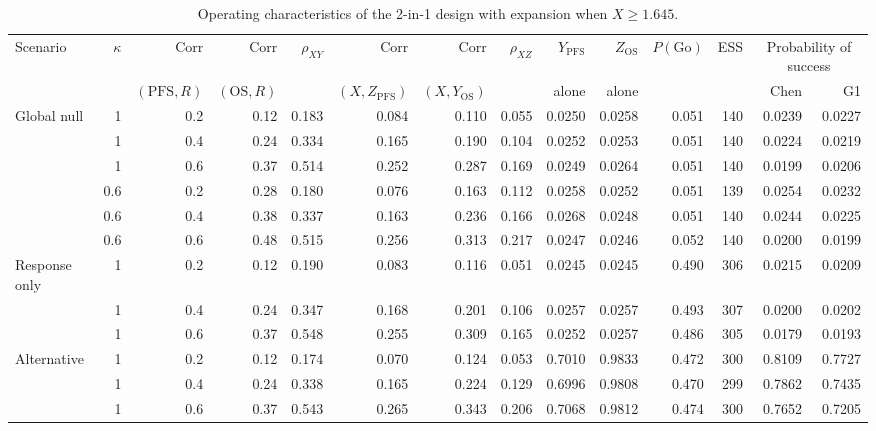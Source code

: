 \begin{table}[htbp]
\centering
\caption{Operating characteristics of the 2-in-1 design with expansion when $X \ge 1.645$.}
\label{tab:twoinone}
\begin{threeparttable}
\footnotesize\setlength{\tabcolsep}{3pt}
\begin{tabular}{lrrrrrrrrrrrrr}
\toprule
Scenario & $\kappa$ & $\mathrm{Corr}$ & $\mathrm{Corr}$ & $\rho_{XY}$ & $\mathrm{Corr}$ & $\mathrm{Corr}$ & $\rho_{XZ}$ & $Y_{\mathrm{PFS}}$ & $Z_{\mathrm{OS}}$ & $P(\mathrm{Go})$ & ESS & \multicolumn{2}{c}{Probability of success} \\
\cmidrule(lr){13-14}
 & & $(\mathrm{PFS}, R)$ & $(\mathrm{OS}, R)$ & & $(X, Z_{\mathrm{PFS}})$ & $(X, Y_{\mathrm{OS}})$ & & alone & alone & & & Chen & G1 \\
\midrule
Global null & 1 & 0.2 & 0.12 & 0.183 & 0.084 & 0.110 & 0.055 & 0.0250 & 0.0258 & 0.051 & 140 & 0.0239 & 0.0227 \\
 & 1 & 0.4 & 0.24 & 0.334 & 0.165 & 0.190 & 0.104 & 0.0252 & 0.0253 & 0.051 & 140 & 0.0224 & 0.0219 \\
 & 1 & 0.6 & 0.37 & 0.514 & 0.252 & 0.287 & 0.169 & 0.0249 & 0.0264 & 0.051 & 140 & 0.0199 & 0.0206 \\
 & 0.6 & 0.2 & 0.28 & 0.180 & 0.076 & 0.163 & 0.112 & 0.0258 & 0.0252 & 0.051 & 139 & 0.0254 & 0.0232 \\
 & 0.6 & 0.4 & 0.38 & 0.337 & 0.163 & 0.236 & 0.166 & 0.0268 & 0.0248 & 0.051 & 140 & 0.0244 & 0.0225 \\
 & 0.6 & 0.6 & 0.48 & 0.515 & 0.256 & 0.313 & 0.217 & 0.0247 & 0.0246 & 0.052 & 140 & 0.0200 & 0.0199 \\
\midrule
Response only & 1 & 0.2 & 0.12 & 0.190 & 0.083 & 0.116 & 0.051 & 0.0245 & 0.0245 & 0.490 & 306 & 0.0215 & 0.0209 \\
 & 1 & 0.4 & 0.24 & 0.347 & 0.168 & 0.201 & 0.106 & 0.0257 & 0.0257 & 0.493 & 307 & 0.0200 & 0.0202 \\
 & 1 & 0.6 & 0.37 & 0.548 & 0.255 & 0.309 & 0.165 & 0.0252 & 0.0257 & 0.486 & 305 & 0.0179 & 0.0193 \\
\midrule
Alternative & 1 & 0.2 & 0.12 & 0.174 & 0.070 & 0.124 & 0.053 & 0.7010 & 0.9833 & 0.472 & 300 & 0.8109 & 0.7727 \\
 & 1 & 0.4 & 0.24 & 0.338 & 0.165 & 0.224 & 0.129 & 0.6996 & 0.9808 & 0.470 & 299 & 0.7862 & 0.7435 \\
 & 1 & 0.6 & 0.37 & 0.543 & 0.265 & 0.343 & 0.206 & 0.7068 & 0.9812 & 0.474 & 300 & 0.7652 & 0.7205 \\

\end{tabular}
\end{threeparttable}
\end{table}
